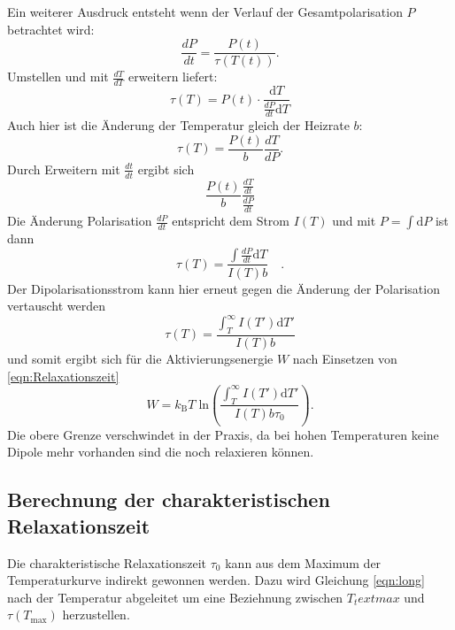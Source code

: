         Ein weiterer Ausdruck entsteht wenn der Verlauf der Gesamtpolarisation $P$ betrachtet wird:
        \begin{equation}
            \frac{dP}{dt} = \frac{P(t)}{\tau(T(t))}.
        \end{equation}
        Umstellen und mit $\frac{dT}{dT}$ erweitern liefert:
        \begin{equation}
            \tau(T) = P(t) \cdot \frac{\text{d}T}{\frac{dP}{dt}\text{d}T}
        \end{equation}
        Auch hier ist die Änderung der Temperatur gleich der Heizrate $b$:
        \begin{equation}
            \tau(T) = \frac{P(t)}{b}\frac{dT}{dP}.
        \end{equation}
        Durch Erweitern mit $\frac{dt}{dt}$ ergibt sich
        \begin{equation}
            \frac{P(t)}{b} \frac{\frac{dT}{dt}}{\frac{dP}{dt}}
        \end{equation}
        Die Änderung Polarisation $\frac{dP}{dt}$ entspricht dem Strom $I(T)$ und mit $P = \int \text{d}P$ ist dann
        \begin{equation}
            \tau(T) = \frac{\int \frac{dP}{dt}\text{d}T}{I(T)b} \quad .
        \end{equation}
        Der Dipolarisationsstrom kann hier erneut gegen die Änderung der Polarisation vertauscht werden
        \begin{equation}
            \tau(T) = \frac{\int_T^\infty I(T')\text{d}T'}{I(T)b}
        \end{equation}
        und somit ergibt sich für die Aktivierungsenergie $W$ nach Einsetzen von \autoref{eqn:Relaxationszeit}
        \begin{equation}
            W = k_\text{B}T\;\text{ln}\left( \frac{\int_T^\infty I(T')\text{d}T'}{I(T)b\tau_0}\right).
            \label{eqn:int}
        \end{equation}
        Die obere Grenze verschwindet in der Praxis, da bei hohen Temperaturen keine Dipole mehr vorhanden sind die noch relaxieren können.

\subsection{Berechnung der charakteristischen Relaxationszeit}

Die charakteristische Relaxationszeit $\tau_0$ kann aus dem Maximum der Temperaturkurve indirekt gewonnen werden.
Dazu wird Gleichung \ref{eqn:long} nach der Temperatur abgeleitet um eine Beziehnung zwischen $T_text{max}$ und $\tau(T_\text{max})$ herzustellen.

